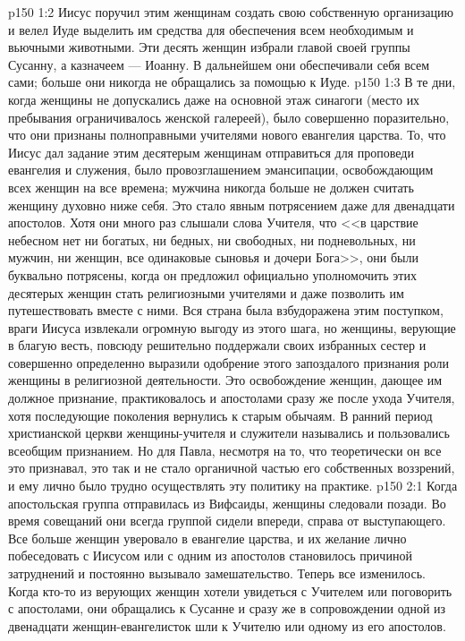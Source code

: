 \vs p150 1:2 Иисус поручил этим женщинам создать свою собственную организацию и велел Иуде выделить им средства для обеспечения всем необходимым и вьючными животными. Эти десять женщин избрали главой своей группы Сусанну, а казначеем --- Иоанну. В дальнейшем они обеспечивали себя всем сами; больше они никогда не обращались за помощью к Иуде.
\vs p150 1:3 В те дни, когда женщины не допускались даже на основной этаж синагоги (место их пребывания ограничивалось женской галереей), было совершенно поразительно, что они признаны полноправными учителями нового евангелия царства. То, что Иисус дал задание этим десятерым женщинам отправиться для проповеди евангелия и служения, было провозглашением эмансипации, освобождающим всех женщин на все времена; мужчина никогда больше не должен считать женщину духовно ниже себя. Это стало явным потрясением даже для двенадцати апостолов. Хотя они много раз слышали слова Учителя, что <<в царствие небесном нет ни богатых, ни бедных, ни свободных, ни подневольных, ни мужчин, ни женщин, все одинаковые сыновья и дочери Бога>>, они были буквально потрясены, когда он предложил официально уполномочить этих десятерых женщин стать религиозными учителями и даже позволить им путешествовать вместе с ними. Вся страна была взбудоражена этим поступком, враги Иисуса извлекали огромную выгоду из этого шага, но женщины, верующие в благую весть, повсюду решительно поддержали своих избранных сестер и совершенно определенно выразили одобрение этого запоздалого признания роли женщины в религиозной деятельности. Это освобождение женщин, дающее им должное признание, практиковалось и апостолами сразу же после ухода Учителя, хотя последующие поколения вернулись к старым обычаям. В ранний период христианской церкви женщины\hyp{}учителя и служители назывались  и пользовались всеобщим признанием. Но для Павла, несмотря на то, что теоретически он все это признавал, это так и не стало органичной частью его собственных воззрений, и ему лично было трудно осуществлять эту политику на практике.
\vs p150 2:1 Когда апостольская группа отправилась из Вифсаиды, женщины следовали позади. Во время совещаний они всегда группой сидели впереди, справа от выступающего. Все больше женщин уверовало в евангелие царства, и их желание лично побеседовать с Иисусом или с одним из апостолов становилось причиной затруднений и постоянно вызывало замешательство. Теперь все изменилось. Когда кто\hyp{}то из верующих женщин хотели увидеться с Учителем или поговорить с апостолами, они обращались к Сусанне и сразу же в сопровождении одной из двенадцати женщин\hyp{}евангелисток шли к Учителю или одному из его апостолов.
